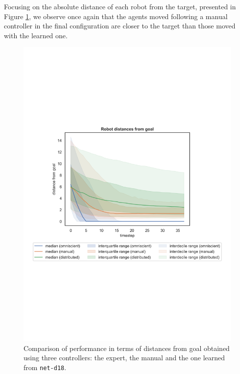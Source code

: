 Focusing on the absolute distance of each robot from the target, presented in 
Figure \ref{fig:net-d18distance}, we observe once again that the agents moved 
following a manual controller in the final configuration are closer to the target 
than those moved with the learned one.
\begin{figure}[!htb]
	\centering
	\includegraphics[width=.65\textwidth]{contents/images/net-d18/distances-from-goal-compressed-distributed}%
	\caption[Evaluation of \texttt{net-d18} distances from goal.]{Comparison of 
		performance in terms of distances from goal obtained using three 
		controllers: the expert, the manual and the one learned from 
		\texttt{net-d18}.}
	\label{fig:net-d18distance}
\end{figure}

